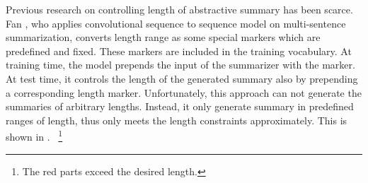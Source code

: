 Previous research on controlling length of abstractive summary
has been scarce.
Fan , who applies convolutional sequence to sequence model on multi-sentence summarization,
converts length range as some special markers which are predefined and fixed.
These markers are included in the training vocabulary.
At training time, the model prepends the input of the summarizer with the marker.
At test time, it controls the length of the generated summary also by
prepending a corresponding length marker.
Unfortunately, this approach can not generate the summaries of
arbitrary lengths. Instead, it only generate summary in predefined
ranges of length, thus only meets the length constraints approximately.
This is shown in .
~\footnote{The red parts exceed the desired length.}

